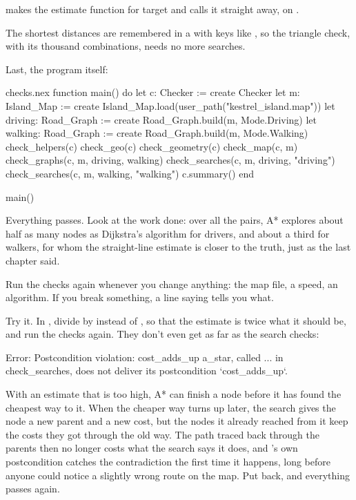  makes the estimate function for target
 and calls it straight away, on .

The shortest distances are remembered in a  with keys like
, so the triangle check, with its thousand
combinations, needs no more searches.

Last, the program itself:

\begin{append}{checks.nex}
function main() do
  let c: Checker := create Checker
  let m: Island_Map := create Island_Map.load(user_path("kestrel_island.map"))
  let driving: Road_Graph := create Road_Graph.build(m, Mode.Driving)
  let walking: Road_Graph := create Road_Graph.build(m, Mode.Walking)
  check_helpers(c)
  check_geo(c)
  check_geometry(c)
  check_map(c, m)
  check_graphs(c, m, driving, walking)
  check_searches(c, m, driving, "driving")
  check_searches(c, m, walking, "walking")
  c.summary()
end

main()
\end{append}


Everything passes. Look at the work done: over all the pairs, A* explores
about half as many nodes as Dijkstra's algorithm for drivers, and about a
third for walkers, for whom the straight-line estimate is closer to the
truth, just as the last chapter said.

Run the checks again whenever you change anything: the map file, a speed,
an algorithm. If you break something, a line saying  tells you
what.

Try it. In , divide by  instead of
, so that the estimate is twice what it should be, and run the
checks again. They don't even get as far as the search checks:

\begin{textout}
Error: Postcondition violation: cost_adds_up
  a_star, called ... in check_searches, does not deliver its postcondition
  `cost_adds_up`.
\end{textout}

With an estimate that is too high, A* can finish a node before it has found
the cheapest way to it. When the cheaper way turns up later, the search
gives the node a new parent and a new cost, but the nodes it already
reached from it keep the costs they got through the old way. The path
traced back through the parents then no longer costs what the search
says it does, and 's own postcondition catches the
contradiction the first time it happens, long before anyone could notice a
slightly wrong route on the map. Put  back, and everything
passes again.
